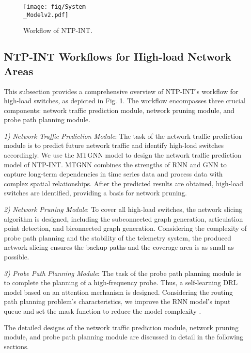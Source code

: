 \documentclass[journal]{IEEEtran}
\begin{document}
\begin{figure}
\centering
\setlength{\abovecaptionskip}{0.cm}

\texttt{[image: fig/System\\\_Modelv2.pdf]}
\caption{Workflow of NTP-INT. }
\label{fig2}
\end{figure}
\vspace{-0.5em}
\subsection{NTP-INT Workflows for High-load Network Areas}

This subsection provides a comprehensive overview of NTP-INT's workflow for high-load switches, as depicted in Fig. \ref{fig2}. The workflow encompasses three crucial components: network traffic prediction module, network pruning module, and probe path planning module.

\emph{1) Network Traffic Prediction Module}:
The task of the network traffic prediction module is to predict future network traffic and identify high-load switches accordingly.
We use the MTGNN model to design the network traffic prediction model \cite{27} of NTP-INT. MTGNN combines the strengths of RNN and GNN to capture long-term dependencies in time series data and process data with complex spatial relationships. After the predicted results are obtained, high-load switches are identified, providing a basis for network pruning.



\emph{2) Network Pruning Module}:
To cover all high-load switches, the network slicing algorithm is designed, including the subconnected graph generation, articulation point detection, and biconnected graph generation. Considering the complexity of probe path planning and the stability of the telemetry system, the produced network slicing ensures the backup paths and the coverage area is as small as possible.



\emph{3) Probe Path Planning Module}:
The task of the probe path planning module is to complete the planning of a high-frequency probe. Thus, a self-learning DRL model based on an attention mechanism is designed. Considering the routing path planning problem's characteristics, we improve the RNN model's input queue and set the mask function to reduce the model complexity \cite{41}.

The detailed designs of the network traffic prediction module, network pruning module, and probe path planning module are discussed in detail in the following sections.
\end{document}

